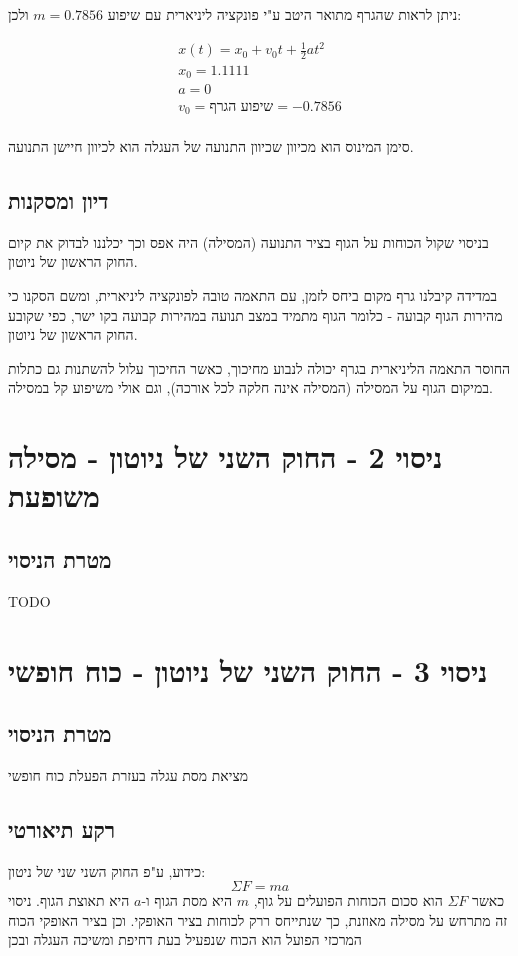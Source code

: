 \documentclass[14pt]{extarticle}
\begin{document}
ניתן לראות שהגרף מתואר היטב ע"י פונקציה ליניארית עם שיפוע $m=0.7856$ ולכן:
\begin{center}
\begin{equation}
\begin{aligned}
    x(t) = x_0 + v_0 t + \frac{1}{2} a t^2 \\
    x_0 = 1.1111 \\
    a = 0 \\
    v_0 = \textbf{שיפוע הגרף} = -0.7856 \\
\end{aligned}
\end{equation}
\end{center}
סימן המינוס הוא מכיוון שכיוון התנועה של העגלה הוא לכיוון חיישן התנועה.

\subsection*{דיון ומסקנות}
בניסוי שקול הכוחות על הגוף בציר התנועה (המסילה) היה אפס וכך יכלננו לבדוק את קיום החוק הראשון של ניוטון.

במדידה קיבלנו גרף מקום ביחס לזמן, עם התאמה טובה לפונקציה ליניארית,  ומשם הסקנו כי מהירות הגוף קבועה - כלומר הגוף מתמיד במצב תנועה במהירות קבועה בקו ישר, כפי שקובע החוק הראשון של ניוטון.

החוסר התאמה הליניארית בגרף יכולה לנבוע מחיכוך, כאשר החיכוך עלול להשתנות גם כתלות במיקום הגוף על המסילה (המסילה אינה חלקה לכל אורכה), וגם אולי משיפוע קל במסילה.

\section*{ניסוי 2 - החוק השני של ניוטון - מסילה משופעת}
\subsection*{מטרת הניסוי}
TODO

\section*{ניסוי 3 - החוק השני של ניוטון - כוח  חופשי}
\subsection*{מטרת הניסוי}
מציאת מסת עגלה בעזרת הפעלת כוח חופשי
\subsection*{רקע תיאורטי}   
כידוע, ע"פ החוק השני שני של ניטון:
\begin{equation}
\Sigma F = m a
\end{equation}
כאשר $\Sigma F$ הוא סכום הכוחות הפועלים על גוף, $m$ היא מסת הגוף ו-$a$ היא תאוצת הגוף.
ניסוי זה מתרחש על מסילה מאוזנת, כך שנתייחס ררק לכוחות בציר האופקי.
וכן בציר האופקי הכוח המרכזי הפועל הוא הכוח שנפעיל בעת דחיפת ומשיכה העגלה ובכן
\end{document}
